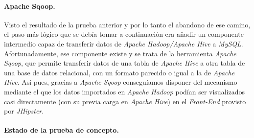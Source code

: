 \par
\paragraph*{Apache Sqoop.}
\par
Visto el resultado de la prueba anterior y por lo tanto el abandono de ese camino, el paso más lógico que se debía tomar a continuación era añadir un componente intermedio capaz de transferir datos de \textit{Apache Hadoop/Apache Hive} a \textit{MySQL}. Afortunadamente, ese componente existe y se trata de la herramienta \textit{Apache Sqoop}, que permite transferir datos de una tabla de \textit{Apache Hive} a otra tabla de una base de datos relacional, con un formato parecido o igual a la de \textit{Apache Hive}. Así pues, gracias a \textit{Apache Sqoop} conseguíamos disponer del mecanismo mediante el que los datos importados en \textit{Apache Hadoop} podían ser visualizados casi directamente (con su previa carga en \textit{Apache Hive}) en el \textit{Front-End} provisto por \textit{JHipster}. 


\par
\paragraph*{Estado de la prueba de concepto.}

